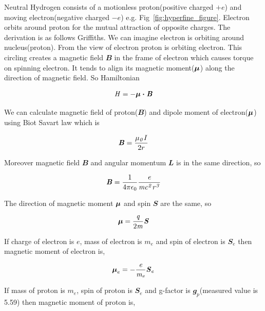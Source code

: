 \documentclass[fleqn,usenatbib]{mnras}
\begin{document}
Neutral Hydrogen consists of a motionless proton(positive charged $+e$) and moving electron(negative charged $-e$) e.g. Fig~\ref{fig:hyperfine_figure}. Electron orbits around proton for the mutual attraction of opposite charges. The derivation is as follows Griffiths\citep{griffiths2016introduction}. We can imagine electron is orbiting around nucleus(proton). From the view of electron proton is orbiting electron. This circling creates a magnetic field $\mathbfit{B}$ in the frame of electron which causes torque on spinning electron. It tends to align its magnetic moment($\bmath{\mathit{\umu}}$) along the direction of magnetic field. So Hamiltonian

\begin{equation}
  \mathit{H}=-\bmath{\mathit{\umu}\cdot\mathit{B}}
\end{equation}  

We can calculate magnetic field of proton($\mathbfit{B}$) and dipole moment of electron($\bmath{\mathit{\umu}}$) using Biot Savart law which is

\begin{equation}
  \textbf{\textit{B}}=\frac{\mathit{\mu_{0}I}}{2r}
\end{equation}

Moreover magnetic field $\mathbfit{B}$ and angular momentum $\mathbfit{L}$ is in the same direction, so

\begin{equation}
 \textbf{\textit{B}}=\frac{1}{4\pi\-\epsilon_{0}}\frac{\mathit{e}}{\mathit{mc^{2}r^{3}}}
\end{equation}

The direction of magnetic moment $\bmath{\mathit{\umu}}$ and spin $\mathbfit{S}$ are the same, so

\begin{equation}
 \bmath{\mathit{\umu}}=\frac{\mathit{q}}{2\mathit{m}}\mathbfit{S}
\end{equation}

If charge of electron is $\mathit{e}$, mass of electron is $\mathit{m_{e}}$ and spin of electron is $\mathbfit{S}_{e}$ then magnetic moment of electron is,

\begin{equation}
 \mathit{\bmath{\umu}}_{e}=-\frac{\mathit{e}}{\mathit{m_{e}}}\mathbfit{S}_{e}
\end{equation}

If mass of proton is $\mathit{m_{e}}$, spin of proton is ${\mathbfit{S}}_{e}$ and g-factor is $\mathbfit{g}_{p}$(measured value is 5.59) then magnetic moment of proton is,
\end{document}
